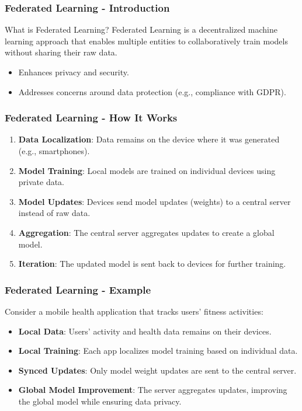 \documentclass{beamer}
\begin{document}
\begin{frame}[fragile]
    \frametitle{Federated Learning - Introduction}
    \begin{block}{What is Federated Learning?}
        Federated Learning is a decentralized machine learning approach that enables multiple entities to collaboratively train models without sharing their raw data. 
    \end{block}
    
    \begin{itemize}
        \item Enhances privacy and security.
        \item Addresses concerns around data protection (e.g., compliance with GDPR).
    \end{itemize}
\end{frame}

\begin{frame}[fragile]
    \frametitle{Federated Learning - How It Works}
    \begin{enumerate}
        \item \textbf{Data Localization}: Data remains on the device where it was generated (e.g., smartphones).
        \item \textbf{Model Training}: Local models are trained on individual devices using private data.
        \item \textbf{Model Updates}: Devices send model updates (weights) to a central server instead of raw data.
        \item \textbf{Aggregation}: The central server aggregates updates to create a global model.
        \item \textbf{Iteration}: The updated model is sent back to devices for further training.
    \end{enumerate}
\end{frame}

\begin{frame}[fragile]
    \frametitle{Federated Learning - Example}
    Consider a mobile health application that tracks users' fitness activities:
    
    \begin{itemize}
        \item \textbf{Local Data}: Users' activity and health data remains on their devices.
        \item \textbf{Local Training}: Each app localizes model training based on individual data.
        \item \textbf{Synced Updates}: Only model weight updates are sent to the central server.
        \item \textbf{Global Model Improvement}: The server aggregates updates, improving the global model while ensuring data privacy.
    \end{itemize}
\end{frame}
\end{document}
